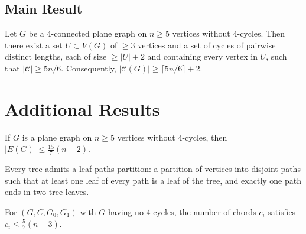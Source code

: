 \section{Main Result}

\begin{theorem}
  \label{thm:no_four_cycles}
  \notready
  Let $G$ be a $4$-connected plane graph on $n \ge 5$ vertices without
  $4$-cycles. Then there exist a set $U \subset V(G)$ of $\ge 3$ vertices
  and a set of cycles of pairwise distinct lengths, each of size $\ge |U|+2$
  and containing every vertex in $U$, such that $|\mathcal{C}| \ge 5n/6$.
  Consequently, $|\mathcal{C}(G)| \ge \lceil 5n/6 \rceil + 2$.
\end{theorem}

\chapter{Additional Results}

\begin{proposition}
  \label{prop:edge_bound}
  \notready
  If $G$ is a plane graph on $n \ge 5$ vertices without $4$-cycles, then
  $|E(G)| \le \frac{15}{7}(n-2)$.
\end{proposition}

\begin{proposition}
  \label{prop:leaf_paths}
  \notready
  Every tree admits a leaf-paths partition: a partition of vertices into
  disjoint paths such that at least one leaf of every path is a leaf of
  the tree, and exactly one path ends in two tree-leaves.
\end{proposition}

\begin{proposition}
  \label{prop:chord_bound}
  \notready
  For $(G, C, G_0, G_1)$ with $G$ having no $4$-cycles, the number of
  chords $c_i$ satisfies $c_i \le \frac{5}{7}(n-3)$.
\end{proposition}

